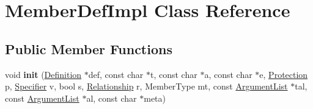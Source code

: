\hypertarget{class_member_def_impl}{}\section{Member\+Def\+Impl Class Reference}
\label{class_member_def_impl}
\subsection*{Public Member Functions}
\begin{DoxyCompactItemize}
\item 
\mbox{\label{class_member_def_impl_ae42ed5085749775040949bcf1da71a9b}} 
void {\bfseries init} (\mbox{\hyperlink{class_definition}{Definition}} $\ast$def, const char $\ast$t, const char $\ast$a, const char $\ast$e, \mbox{\hyperlink{types_8h_a90e352184df58cd09455fe9996cd4ded}{Protection}} p, \mbox{\hyperlink{types_8h_ab16236bdd10ddf4d73a9847350f0017e}{Specifier}} v, bool s, \mbox{\hyperlink{types_8h_a9d625fe894d9313ec78df1d78553f32e}{Relationship}} r, Member\+Type mt, const \mbox{\hyperlink{class_argument_list}{Argument\+List}} $\ast$tal, const \mbox{\hyperlink{class_argument_list}{Argument\+List}} $\ast$al, const char $\ast$meta)
\end{DoxyCompactItemize}

